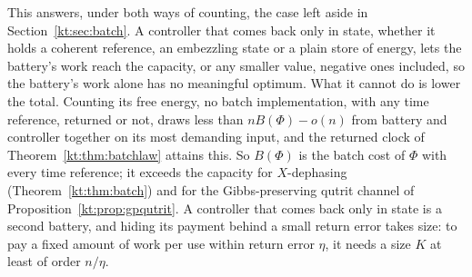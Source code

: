 This answers, under both ways of counting, the case left aside in Section~\ref{kt:sec:batch}. A controller that comes back only in state, whether it holds a coherent reference, an embezzling state or a plain store of energy, lets the battery's work reach the capacity, or any smaller value, negative ones included, so the battery's work alone has no meaningful optimum. What it cannot do is lower the total. Counting its free energy, no batch implementation, with any time reference, returned or not, draws less than $nB(\Phi)-o(n)$ from battery and controller together on its most demanding input, and the returned clock of Theorem~\ref{kt:thm:batchlaw} attains this. So $B(\Phi)$ is the batch cost of $\Phi$ with every time reference; it exceeds the capacity for $X$-dephasing (Theorem~\ref{kt:thm:batch}) and for the Gibbs-preserving qutrit channel of Proposition~\ref{kt:prop:gpqutrit}. A controller that comes back only in state is a second battery, and hiding its payment behind a small return error takes size: to pay a fixed amount of work per use within return error $\eta$, it needs a size $K$ at least of order $n/\eta$.

